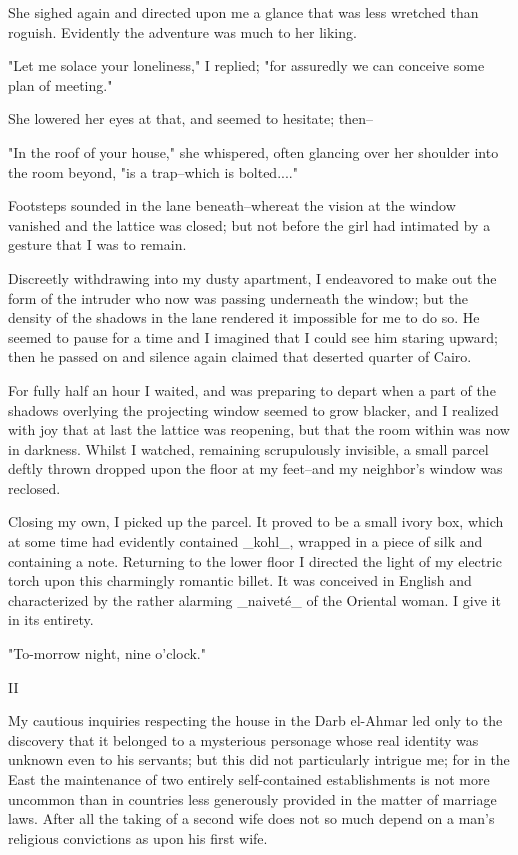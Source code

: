 She sighed again and directed upon me a glance that was less wretched
than roguish. Evidently the adventure was much to her liking.

"Let me solace your loneliness," I replied; "for assuredly we can
conceive some plan of meeting."

She lowered her eyes at that, and seemed to hesitate; then--

"In the roof of your house," she whispered, often glancing over her
shoulder into the room beyond, "is a trap--which is bolted...."

Footsteps sounded in the lane beneath--whereat the vision at the
window vanished and the lattice was closed; but not before the girl
had intimated by a gesture that I was to remain.

Discreetly withdrawing into my dusty apartment, I endeavored to make
out the form of the intruder who now was passing underneath the
window; but the density of the shadows in the lane rendered it
impossible for me to do so. He seemed to pause for a time and I
imagined that I could see him staring upward; then he passed on and
silence again claimed that deserted quarter of Cairo.

For fully half an hour I waited, and was preparing to depart when a
part of the shadows overlying the projecting window seemed to grow
blacker, and I realized with joy that at last the lattice was
reopening, but that the room within was now in darkness. Whilst I
watched, remaining scrupulously invisible, a small parcel deftly
thrown dropped upon the floor at my feet--and my neighbor's window was
reclosed.

Closing my own, I picked up the parcel. It proved to be a small ivory
box, which at some time had evidently contained _kohl_, wrapped in a
piece of silk and containing a note. Returning to the lower floor I
directed the light of my electric torch upon this charmingly romantic
billet. It was conceived in English and characterized by the rather
alarming _naiveté_ of the Oriental woman. I give it in its entirety.

"To-morrow night, nine o'clock."


II

My cautious inquiries respecting the house in the Darb el-Ahmar led
only to the discovery that it belonged to a mysterious personage whose
real identity was unknown even to his servants; but this did not
particularly intrigue me; for in the East the maintenance of two
entirely self-contained establishments is not more uncommon than in
countries less generously provided in the matter of marriage laws.
After all the taking of a second wife does not so much depend on a
man's religious convictions as upon his first wife.

